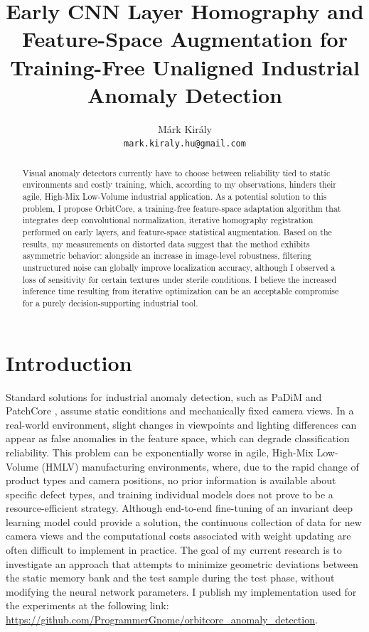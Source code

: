 \documentclass{article}
\title{Early CNN Layer Homography and Feature-Space Augmentation for Training-Free Unaligned Industrial Anomaly Detection}
\author{
	Márk Király \\
	\texttt{mark.kiraly.hu@gmail.com}
}
\begin{document}
	\maketitle
	
	\begin{abstract}
		Visual anomaly detectors currently have to choose between reliability tied to static environments and costly training, which, according to my observations, hinders their agile, High-Mix Low-Volume industrial application. As a potential solution to this problem, I propose OrbitCore, a training-free feature-space adaptation algorithm that integrates deep convolutional normalization, iterative homography registration performed on early layers, and feature-space statistical augmentation. Based on the results, my measurements on distorted data suggest that the method exhibits asymmetric behavior: alongside an increase in image-level robustness, filtering unstructured noise can globally improve localization accuracy, although I observed a loss of sensitivity for certain textures under sterile conditions. I believe the increased inference time resulting from iterative optimization can be an acceptable compromise for a purely decision-supporting industrial tool.
	\end{abstract}
	
	
	\section{Introduction}\label{sec:intro}
	Standard solutions for industrial anomaly detection, such as PaDiM \cite{Defard2021} and PatchCore \cite{Roth2022}, assume static conditions and mechanically fixed camera views. In a real-world environment, slight changes in viewpoints and lighting differences can appear as false anomalies in the feature space, which can degrade classification reliability. This problem can be exponentially worse in agile, High-Mix Low-Volume (HMLV) manufacturing environments, where, due to the rapid change of product types and camera positions, no prior information is available about specific defect types, and training individual models does not prove to be a resource-efficient strategy. Although end-to-end fine-tuning of an invariant deep learning model could provide a solution, the continuous collection of data for new camera views and the computational costs associated with weight updating are often difficult to implement in practice. The goal of my current research is to investigate an approach that attempts to minimize geometric deviations between the static memory bank and the test sample during the test phase, without modifying the neural network parameters. I publish my implementation used for the experiments at the following link: \url{https://github.com/ProgrammerGnome/orbitcore_anomaly_detection}.
	
\end{document}
